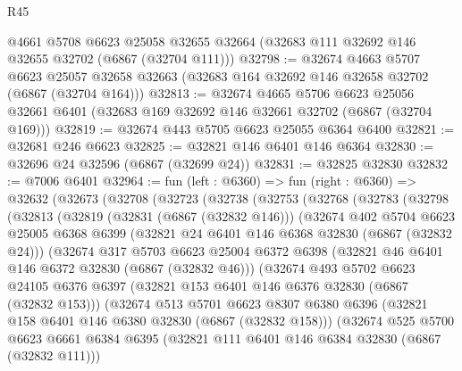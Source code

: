 \begin{lexlean}{R45}
\begin{coremodule}
{    @4661
    @5708
    @6623
    @25058
    @32655
    @32664
    (@32683 @111 @32692 @146 @32655 @32702 (@6867 (@32704 @111)))
@32798 := @32674
    @4663
    @5707
    @6623
    @25057
    @32658
    @32663
    (@32683 @164 @32692 @146 @32658 @32702 (@6867 (@32704 @164)))
@32813 := @32674
    @4665
    @5706
    @6623
    @25056
    @32661
    @6401
    (@32683 @169 @32692 @146 @32661 @32702 (@6867 (@32704 @169)))
@32819 := @32674 @443 @5705 @6623 @25055 @6364 @6400
@32821 := @32681 @246 @6623
@32825 := @32821 @146 @6401 @146 @6364
@32830 := @32696 @24 @32596 (@6867 (@32699 @24))
@32831 := @32825 @32830
@32832 := @7006 @6401
@32964 := fun (left : @6360) =>
  fun (right : @6360) =>
  @32632
    (@32673
      (@32708
        (@32723
          (@32738
            (@32753
              (@32768
                (@32783
                  (@32798
                    (@32813
                      (@32819
                        (@32831 (@6867 (@32832 @146)))
                        (@32674
                          @402
                          @5704
                          @6623
                          @25005
                          @6368
                          @6399
                          (@32821 @24 @6401 @146 @6368 @32830 (@6867 (@32832 @24)))
                          (@32674
                            @317
                            @5703
                            @6623
                            @25004
                            @6372
                            @6398
                            (@32821 @46 @6401 @146 @6372 @32830 (@6867 (@32832 @46)))
                            (@32674
                              @493
                              @5702
                              @6623
                              @24105
                              @6376
                              @6397
                              (@32821 @153 @6401 @146 @6376 @32830 (@6867 (@32832 @153)))
                              (@32674
                                @513
                                @5701
                                @6623
                                @8307
                                @6380
                                @6396
                                (@32821 @158 @6401 @146 @6380 @32830 (@6867 (@32832 @158)))
                                (@32674
                                  @525
                                  @5700
                                  @6623
                                  @6661
                                  @6384
                                  @6395
                                  (@32821 @111 @6401 @146 @6384 @32830 (@6867 (@32832 @111)))
}
\end{coremodule}
\end{lexlean}
